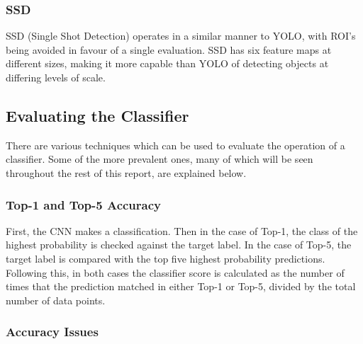 \documentclass[12pt]{report}
\begin{document}
\subsubsection*{SSD}
\begin{flushleft}
SSD (Single Shot Detection) operates in a similar manner to YOLO, with ROI's being avoided in favour of a single evaluation. SSD has six feature maps at different sizes, making it more capable than YOLO of detecting objects at differing levels of scale.
\end{flushleft}

\subsection{Evaluating the Classifier}
\begin{flushleft}
There are various techniques which can be used to evaluate the operation of a classifier. Some of the more prevalent ones, many of which will be seen throughout the rest of this report, are explained below.
\end{flushleft}

\subsubsection*{Top-1 and Top-5 Accuracy}
\begin{flushleft}
First, the CNN makes a classification. Then in the case of Top-1, the class of the highest probability is checked against the target label. In the case of Top-5, the target label is compared with the top five highest probability predictions. Following this, in both cases the classifier score is calculated as the number of times that the prediction matched in either Top-1 or Top-5, divided by the total number of data points.
\end{flushleft}

\subsubsection*{Accuracy Issues}
\end{document}
